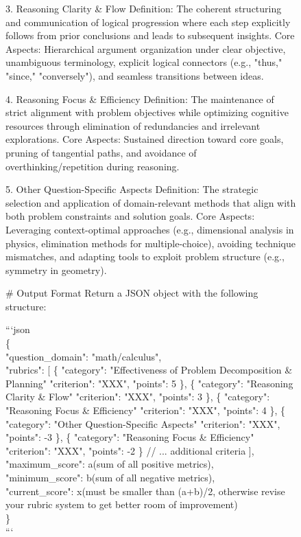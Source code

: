 \begin{figure}[ht]
\begin{lrbox}{\DSRPrompt}
\begin{gptpromptbox}
\begin{minipage}{0.95\linewidth}
3. Reasoning Clarity \& Flow
Definition: The coherent structuring and communication of logical progression where each step explicitly follows from prior conclusions and leads to subsequent insights.
Core Aspects: Hierarchical argument organization under clear objective, unambiguous terminology, explicit logical connectors (e.g., "thus," "since," "conversely"), and seamless transitions between ideas.

4. Reasoning Focus \& Efficiency
Definition: The maintenance of strict alignment with problem objectives while optimizing cognitive resources through elimination of redundancies and irrelevant explorations.
Core Aspects: Sustained direction toward core goals, pruning of tangential paths, and avoidance of overthinking/repetition during reasoning.

5. Other Question-Specific Aspects
Definition: The strategic selection and application of domain-relevant methods that align with both problem constraints and solution goals.
Core Aspects: Leveraging context-optimal approaches (e.g., dimensional analysis in physics, elimination methods for multiple-choice), avoiding technique mismatches, and adapting tools to exploit problem structure (e.g., symmetry in geometry).


\# Output Format
Return a JSON object with the following structure:

```json\\
\{\\
  \quad"question\_domain": "math/calculus",\\
  \quad "rubrics": [
    \{
      "category": "Effectiveness of Problem Decomposition \& Planning" 
      "criterion": "XXX",
      "points": 5
    \},
    \{
      "category": "Reasoning Clarity \& Flow" 
      "criterion": "XXX",
      "points": 3
    \},
    \{
      "category": "Reasoning Focus \& Efficiency" 
      "criterion": "XXX",
      "points": 4
    \},
    \{
      "category": "Other Question-Specific Aspects" 
      "criterion": "XXX",
      "points": -3
    \},
    \{
      "category": "Reasoning Focus \& Efficiency" 
      "criterion": "XXX",
      "points": -2
    \}
    // ... additional criteria
  ],\\
  \quad "maximum\_score": a(sum of all positive metrics),\\
  \quad "minimum\_score": b(sum of all negative metrics),\\
  \quad "current\_score": x(must be smaller than (a+b)/2, otherwise revise your rubric system to get better room of improvement) \\
\}\\
```


\end{minipage}
\end{gptpromptbox}
\end{lrbox}
\end{figure}

